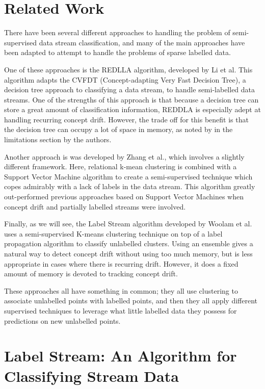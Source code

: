 \documentclass[12pt,a4paper,oneside]{report}
\begin{document}
\section*{Related Work}

There have been several different approaches to handling the problem of semi-supervised data stream classification, and many of the main approaches have been adapted to attempt to handle the problems of sparse labelled data. 

One of these approaches is the REDLLA algorithm, developed by Li et al\cite{Li}. This algorithm adapts the CVFDT (Concept-adapting Very Fast Decision Tree)\cite{CVFDT}, a decision tree approach to classifying a data stream, to handle semi-labelled data streams. One of the strengths of this approach is that because a decision tree can store a great amount of classification information, REDDLA is especially adept at handling recurring concept drift. However, the trade off for this benefit is that the decision tree can occupy a lot of space in memory, as noted by in the limitations section by the authors. 

Another approach is was developed by Zhang et al.\cite{Zhang}, which involves a slightly different framework. Here, relational k-mean clustering is combined with a Support Vector Machine algorithm to create a semi-supervised technique which copes admirably with a lack of labels in the data stream. This algorithm greatly out-performed previous approaches based on Support Vector Machines when concept drift and partially labelled streams were involved. 

Finally, as we will see, the Label Stream algorithm developed by Woolam et al. \cite{LabStr} uses a semi-supervised K-means clustering technique on top of a label propagation algorithm to classify unlabelled clusters. Using an ensemble gives a natural way to detect concept drift without using too much memory, but is less appropriate in cases where there is recurring drift. However, it does a fixed amount of memory is devoted to tracking concept drift. 

These approaches all have something in common; they all use clustering to associate unlabelled points with labelled points, and then they all apply different supervised techniques to leverage what little labelled data they possess for predictions on new unlabelled points. 


\section*{Label Stream: An Algorithm for Classifying Stream Data}
\end{document}
